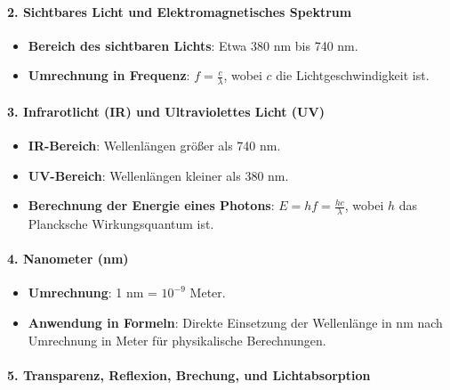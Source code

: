 \documentclass{vorlage-design-main}
\begin{document}
\hypertarget{sichtbares-licht-und-elektromagnetisches-spektrum}{%
\paragraph{2. Sichtbares Licht und Elektromagnetisches
Spektrum}\label{sichtbares-licht-und-elektromagnetisches-spektrum}}

\begin{itemize}

\item
  \textbf{Bereich des sichtbaren Lichts}: Etwa 380 nm bis 740 nm.
\item
  \textbf{Umrechnung in Frequenz}: $f = \frac{c}{\lambda}$, wobei
  $c$ die Lichtgeschwindigkeit ist.
\end{itemize}

\hypertarget{infrarotlicht-ir-und-ultraviolettes-licht-uv}{%
\paragraph{3. Infrarotlicht (IR) und Ultraviolettes Licht
(UV)}\label{infrarotlicht-ir-und-ultraviolettes-licht-uv}}

\begin{itemize}

\item
  \textbf{IR-Bereich}: Wellenlängen größer als 740 nm.
\item
  \textbf{UV-Bereich}: Wellenlängen kleiner als 380 nm.
\item
  \textbf{Berechnung der Energie eines Photons}:
  $E = hf = \frac{hc}{\lambda}$, wobei $h$ das Plancksche
  Wirkungsquantum ist.
\end{itemize}

\hypertarget{nanometer-nm}{%
\paragraph{4. Nanometer (nm)}\label{nanometer-nm}}

\begin{itemize}

\item
  \textbf{Umrechnung}: 1 nm = $10^{-9}$ Meter.
\item
  \textbf{Anwendung in Formeln}: Direkte Einsetzung der Wellenlänge in
  nm nach Umrechnung in Meter für physikalische Berechnungen.
\end{itemize}

\hypertarget{transparenz-reflexion-brechung-und-lichtabsorption}{%
\paragraph{5. Transparenz, Reflexion, Brechung, und
Lichtabsorption}\label{transparenz-reflexion-brechung-und-lichtabsorption}}
\end{document}
